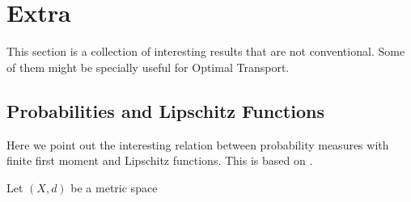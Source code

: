 \section{Extra}

This section is a collection of interesting
results that are not conventional.
Some of them might be specially useful for Optimal Transport.

\subsection{Probabilities and Lipschitz Functions}

Here we point out the interesting relation between
probability measures with finite first moment and Lipschitz
functions. This is based on \citet{perrone2018categorical}.

\begin{theorem}
	Let $(X,d)$ be a metric space
\end{theorem}



